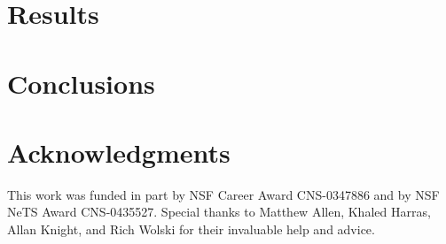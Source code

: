 \documentclass[conference]{IEEEtran}
\begin{document}

\section{Results}\label{sec:results}
\section{Conclusions}\label{sec:conclusions}
\section{Acknowledgments}
This work was funded in part by NSF Career Award CNS-0347886 and by NSF NeTS Award CNS-0435527. Special thanks to Matthew Allen, Khaled Harras, Allan Knight, and Rich Wolski for their invaluable help and advice.


\end{document}
